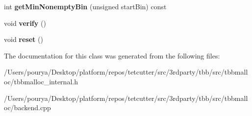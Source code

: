 \begin{DoxyCompactItemize}
\item 
\hypertarget{classrml_1_1internal_1_1Backend_1_1IndexedBins_ad4fa5fec405dfd0750112ec07fb5047a}{}int {\bfseries get\+Min\+Nonempty\+Bin} (unsigned start\+Bin) const \label{classrml_1_1internal_1_1Backend_1_1IndexedBins_ad4fa5fec405dfd0750112ec07fb5047a}

\item 
\hypertarget{classrml_1_1internal_1_1Backend_1_1IndexedBins_a7d7e533336a2d36a3f56e1b1c3ca1ce1}{}void {\bfseries verify} ()\label{classrml_1_1internal_1_1Backend_1_1IndexedBins_a7d7e533336a2d36a3f56e1b1c3ca1ce1}

\item 
\hypertarget{classrml_1_1internal_1_1Backend_1_1IndexedBins_ace7de26cb154e9488281167583570d60}{}void {\bfseries reset} ()\label{classrml_1_1internal_1_1Backend_1_1IndexedBins_ace7de26cb154e9488281167583570d60}

\end{DoxyCompactItemize}


The documentation for this class was generated from the following files\+:\begin{DoxyCompactItemize}
\item 
/\+Users/pourya/\+Desktop/platform/repos/tetcutter/src/3rdparty/tbb/src/tbbmalloc/tbbmalloc\+\_\+internal.\+h\item 
/\+Users/pourya/\+Desktop/platform/repos/tetcutter/src/3rdparty/tbb/src/tbbmalloc/backend.\+cpp\end{DoxyCompactItemize}
